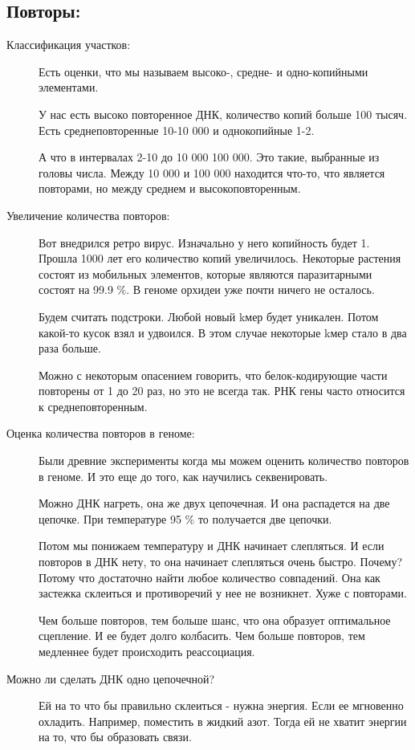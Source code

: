 \subsection{Повторы:}
\begin{description}
\item[Классификация участков:]
Есть оценки, что мы называем высоко-, средне- и одно-копийными элементами.

У нас есть высоко повторенное ДНК, количество копий больше 100 тысяч. 
Есть среднеповторенные 10-10 000 и однокопийные 1-2. 

А что в интервалах 2-10 до 10 000 100 000. Это такие, 
выбранные из головы числа. Между 10 000 и 100 000 находится что-то, 
что является повторами, но между среднем и высокоповторенным. 

\item[Увеличение количества повторов:]
Вот внедрился ретро вирус. Изначально у него копийность 
будет 1. Прошла 1000 лет его количество копий увеличилось. 
Некоторые растения состоят из мобильных элементов, которые 
являются паразитарными состоят на 99.9 \%. В геноме орхидеи 
уже почти ничего не осталось. 

Будем считать подстроки. Любой новый kмер будет уникален. Потом 
какой-то кусок взял и удвоился. В этом случае некоторые kмер стало 
в два раза больше. 

Можно с некоторым опасением говорить, что белок-кодирующие 
части повторены от 1 до 20 раз, но это не всегда так. 
РНК гены часто относится к среднеповторенным. 

\item[Оценка количества повторов в геноме:]
Были древние эксперименты  когда мы можем оценить количество 
повторов в геноме. И это еще до того, как
научились секвенировать. 

Можно ДНК нагреть, она же двух цепочечная. И она распадется на 
две цепочке. При температуре 95 \% то получается две цепочки. 

Потом мы понижаем температуру и ДНК начинает слепляться. 
И если повторов в ДНК нету, то она начинает слепляться очень быстро. 
Почему? Потому что достаточно найти любое количество совпадений. Она 
как застежка склеиться и противоречий у нее не возникнет. Хуже с повторами. 

Чем больше повторов, тем больше шанс, что она образует оптимальное сцепление. 
И ее будет долго колбасить. Чем больше повторов, 
тем медленнее будет происходить реассоциация. 

\item[Можно ли сделать ДНК одно цепочечной?] Ей на то что бы правильно 
склеиться - нужна энергия. Если ее мгновенно охладить. Например, 
поместить в жидкий азот. Тогда ей не хватит 
энергии на то, что бы образовать связи.  
\end{description}

